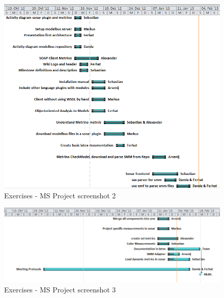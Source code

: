 \newpage

\begin{figure}[htb]
\begin{center}
\includegraphics[width=\textwidth]{msp_part2}
\caption{Exercises - MS Project screenshot 2}
\end{center}
\end{figure}

\newpage

\begin{figure}[htb]
\begin{center}
\includegraphics[width=\textwidth]{msp_part3}
\caption{Exercises - MS Project screenshot 3}
\end{center}
\end{figure}
